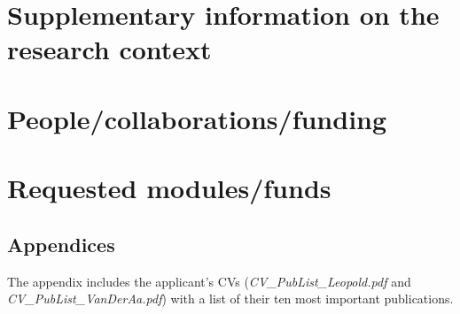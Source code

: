 \documentclass{scrartcl}
\begin{document}
\section{Supplementary information on the research context}


\section{People/collaborations/funding}


\section{Requested modules/funds}


\subsection*{Appendices}

The appendix includes the applicant's CVs (\textit{CV\_PubList\_Leopold.pdf} and \textit{CV\_PubList\_VanDerAa.pdf}) with a list of their ten most important publications.  
\end{document}
